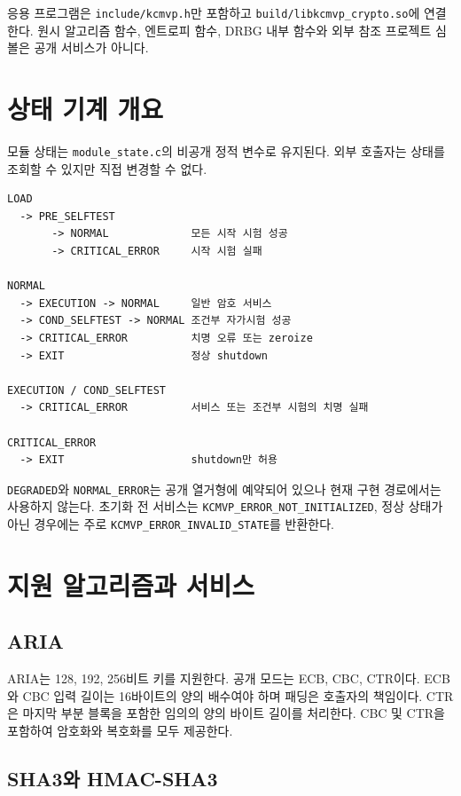 \documentclass[11pt,a4paper]{article}
\begin{document}
응용 프로그램은 \texttt{include/kcmvp.h}만 포함하고
\texttt{build/libkcmvp\_crypto.so}에 연결한다. 원시 알고리즘 함수, 엔트로피
함수, DRBG 내부 함수와 외부 참조 프로젝트 심볼은 공개 서비스가 아니다.

\section{상태 기계 개요}

모듈 상태는 \texttt{module\_state.c}의 비공개 정적 변수로 유지된다. 외부
호출자는 상태를 조회할 수 있지만 직접 변경할 수 없다.

\begin{lstlisting}
LOAD
  -> PRE_SELFTEST
       -> NORMAL             모든 시작 시험 성공
       -> CRITICAL_ERROR     시작 시험 실패

NORMAL
  -> EXECUTION -> NORMAL     일반 암호 서비스
  -> COND_SELFTEST -> NORMAL 조건부 자가시험 성공
  -> CRITICAL_ERROR          치명 오류 또는 zeroize
  -> EXIT                    정상 shutdown

EXECUTION / COND_SELFTEST
  -> CRITICAL_ERROR          서비스 또는 조건부 시험의 치명 실패

CRITICAL_ERROR
  -> EXIT                    shutdown만 허용
\end{lstlisting}

\texttt{DEGRADED}와 \texttt{NORMAL\_ERROR}는 공개 열거형에 예약되어 있으나
현재 구현 경로에서는 사용하지 않는다. 초기화 전 서비스는
\texttt{KCMVP\_ERROR\_NOT\_INITIALIZED}, 정상 상태가 아닌 경우에는 주로
\texttt{KCMVP\_ERROR\_INVALID\_STATE}를 반환한다.

\section{지원 알고리즘과 서비스}

\subsection{ARIA}

ARIA는 128, 192, 256비트 키를 지원한다. 공개 모드는 ECB, CBC, CTR이다.
ECB와 CBC 입력 길이는 16바이트의 양의 배수여야 하며 패딩은 호출자의
책임이다. CTR은 마지막 부분 블록을 포함한 임의의 양의 바이트 길이를
처리한다. CBC 및 CTR을 포함하여 암호화와 복호화를 모두 제공한다.

\subsection{SHA3와 HMAC-SHA3}
\end{document}
